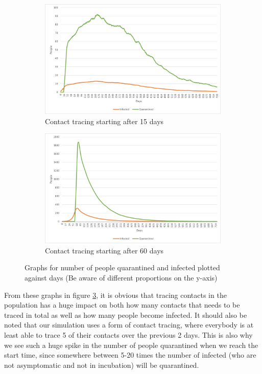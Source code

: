 \begin{figure}[H]
\centering
\begin{subfigure}{.5\textwidth}
  \centering
  \includegraphics[width=.95\linewidth]{0_billeder/CT15Days.png}
  \caption{Contact tracing starting after 15 days}
  \label{Subfig:CT15}
\end{subfigure}%
\begin{subfigure}{.5\textwidth}
  \centering
  \includegraphics[width=.95\linewidth]{0_billeder/CT60Days.png}
  \caption{Contact tracing starting after 60 days}
  \label{Subfig:CT60}
\end{subfigure}
\caption{Graphs for number of people quarantined and infected plotted against days (Be aware of different proportions on the y-axis)}
\label{fig:CTstart1}
\end{figure}

From these graphs in figure \ref{fig:CTstart1}, it is obvious that tracing contacts in the population has a huge impact on both how many contacts that needs to be traced in total as well as how many people become infected. It should also be noted that our simulation uses a  form of contact tracing, where everybody is at least able to trace 5 of their contacts over the previous 2 days. This is also why we see such a huge spike in the number of people quarantined when we reach the start time, since somewhere between 5-20 times the number of infected (who are not asymptomatic and not in incubation) will be quarantined.

